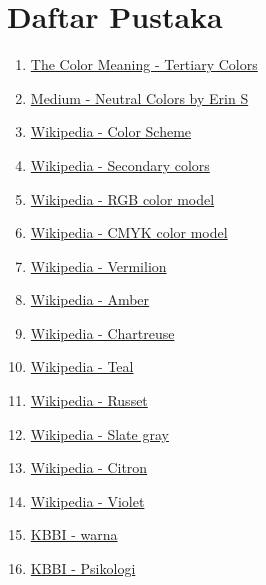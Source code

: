 \documentclass[a4paper]{article}
\newcommand{\nonumsection}[1]{\section*{#1}
\addcontentsline{toc}{section}{#1}
}
\begin{document}
\newpage
\nonumsection{Daftar Pustaka}
\begin{enumerate}
  \item \textcolor{blue}{\href{https://thecolorsmeaning.com/tertiary-colors/}{The Color Meaning - Tertiary Colors}}
  \item \textcolor{blue}{\href{https://medium.com/a-history-of-color/neutral-colors-e394cfce452}{Medium - Neutral Colors by Erin S}}
  \item \textcolor{blue}{\href{https://en.m.wikipedia.org/wiki/Color_scheme}{Wikipedia - Color Scheme}}
  \item \textcolor{blue}{\href{https://en.m.wikipedia.org/wiki/Secondary_color}{Wikipedia - Secondary colors}}
  \item \textcolor{blue}{\href{https://en.m.wikipedia.org/wiki/RGB_color_model}{Wikipedia - RGB color model}}
  \item \textcolor{blue}{\href{https://en.m.wikipedia.org/wiki/CMYK_color_model}{Wikipedia - CMYK color model}}
  \item \textcolor{blue}{\href{https://en.m.wikipedia.org/wiki/Vermilion}{Wikipedia - Vermilion}}
  \item \textcolor{blue}{\href{https://en.m.wikipedia.org/wiki/Amber_(color)}{Wikipedia - Amber}}
  \item \textcolor{blue}{\href{https://en.m.wikipedia.org/wiki/Chartreuse_(color)}{Wikipedia - Chartreuse}}
  \item \textcolor{blue}{\href{https://en.m.wikipedia.org/wiki/Teal}{Wikipedia - Teal}}
  \item \textcolor{blue}{\href{https://en.m.wikipedia.org/wiki/Russet_(color)}{Wikipedia - Russet}}
  \item \textcolor{blue}{\href{https://en.m.wikipedia.org/wiki/Slate_gray}{Wikipedia - Slate gray}}
  \item \textcolor{blue}{\href{https://en.m.wikipedia.org/wiki/Citron_(color)}{Wikipedia - Citron}}
  \item \textcolor{blue}{\href{https://en.m.wikipedia.org/wiki/Violet_(color)}{Wikipedia - Violet}}
  \item \textcolor{blue}{\href{https://kbbi.kemdikbud.go.id/entri/Warna}{KBBI - warna}}
  \item \textcolor{blue}{\href{https://kbbi.kemdikbud.go.id/entri/Psikologi}{KBBI - Psikologi}}
  
\end{enumerate}
\end{document}

